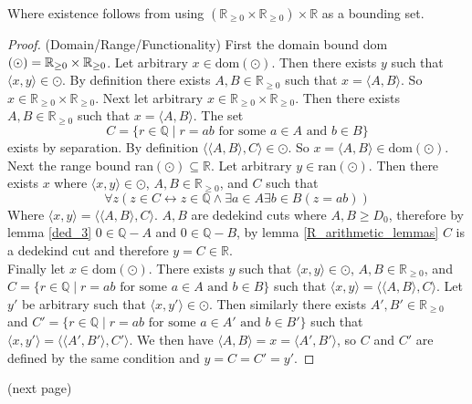 \documentclass{report}
\begin{document}
\noindent Where existence follows from using $(\mathbb R_{\geq0}\times\mathbb R_{\geq0})\times\mathbb R$ as a bounding set.
\begin{proof}(Domain/Range/Functionality)
First the domain bound dom$(\odot)=\mathbb R_{\geq0}\\\times\mathbb R_{\geq0}$. Let arbitrary $x\in\text{dom}(\odot)$. Then there
exists $y$ such that $\langle x,y\rangle\in\odot$. By definition there exists $A,B\in\mathbb R_{\geq0}$ 
such that $x=\langle A,B\rangle$. So $x\in\mathbb R_{\geq0}\times\mathbb R_{\geq0}$.
Next let arbitrary $x\in\mathbb R_{\geq0}\times\mathbb R_{\geq0}$.
Then there exists $A,B\in\mathbb R_{\geq0}$ such that $x=\langle A,B\rangle$. The set
\begin{equation*}
C=\{r\in\mathbb Q\mid r=ab\text{ for some $a\in A$ and $b\in B$}\}
\end{equation*}
exists by separation. By definition $\langle\langle A,B\rangle,C\rangle\in\odot$. So $x=\langle A,B\rangle\in\text{dom}(\odot)$.\\
\indent Next the range bound ran$(\odot)\subseteq\mathbb R$. Let arbitrary $y\in\text{ran}(\odot)$.
Then there exists $x$ where $\langle x,y\rangle\in\odot$, $A,B\in\mathbb R_{\geq0}$, and $C$ such that
\begin{equation*}
\forall z(z\in C\leftrightarrow z\in\mathbb Q\land\exists a\in A\exists b\in B(z=ab))
\end{equation*}
Where $\langle x,y\rangle=\langle\langle A,B\rangle,C\rangle$.
$A,B$ are dedekind cuts where $A,B\geq D_0$, therefore by lemma \ref{ded_3} $0\in\mathbb Q-A$ and $0\in\mathbb Q-B$, 
by lemma \ref{R_arithmetic_lemmas} $C$ is a dedekind cut and therefore $y=C\in\mathbb R$.\\
\indent Finally let $x\in\text{dom}(\odot)$. There exists $y$ such that $\langle x,y\rangle\in\odot$, $A,B\in\mathbb R_{\geq0}$, 
and $C=\{r\in\mathbb Q\mid r=ab\text{ for some $a\in A$ and $b\in B$}\}$ such that $\langle x,y\rangle=\langle\langle A,B\rangle,C\rangle$. 
Let $y'$ be arbitrary such that $\langle x,y'\rangle\in\odot$. Then similarly there exists $A',B'\in\mathbb R_{\geq0}$
and $C'=\{r\in\mathbb Q\mid r=ab\text{ for some $a\in A'$ and $b\in B'$}\}$ such that $\langle x,y'\rangle=\langle\langle A',B'\rangle,C'\rangle$. 
We then have $\langle A,B\rangle=x=\langle A',B'\rangle$, so $C$ and $C'$ are defined by the same condition and $y=C=C'=y'$.
\end{proof}
\noindent(next page)\newpage
\end{document}
